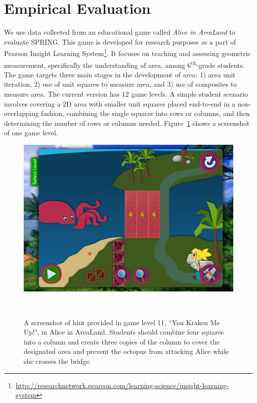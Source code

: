 \documentclass{sigchi}
\def\algname{SPRING\xspace}
\begin{document}
	\section{Empirical Evaluation}
	\label{sec:experiments}
	
	
	We use data collected from an educational game called  \textit {Alice in AreaLand} to evaluate \algname.
	This game is developed for research purposes as a part of Pearson Insight Learning System\footnote{\url{http://researchnetwork.pearson.com/learning-science/insight-learning-system}}. 
	It focuses on teaching and assessing geometric measurement, specifically the understanding of area, among 6\textsuperscript{th}-grade students. 
	The game targets three main stages in the development of area: 1) area unit iteration, 2) use of unit squares to measure area, and 3) use of composites to measure area. 
	The current version has 12 game levels. 
	A simple student scenario involves covering a 2D area with smaller unit squares placed end-to-end in a non-overlapping fashion, combining the single squares into rows or columns, and then determining the number of rows or columns needed. 
	Figure~\ref{fig:figurekracken} shows a screenshot of one game level.
	
	\begin{figure}
		\centering
		\includegraphics[width=0.9\columnwidth]{figures/kracken}
		\caption{A screenshot of hint provided in game level 11, ``You Kraken Me Up!", in Alice in AreaLand. Students should combine four squares into a column and create three copies of the column to cover the designated area and prevent the octopus from attacking Alice while she crosses the bridge.}~\label{fig:figurekracken}
	\end{figure}
	
\end{document}
